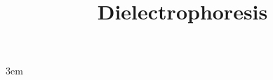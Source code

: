 \documentclass[twoside,11pt]{book}
\title{\textbf{Dielectrophoresis}}
\begin{document}

\emergencystretch 3em

\maketitle
\tableofcontents
\listoffigures

% 

% 
% 


\medskip


\end{document}
